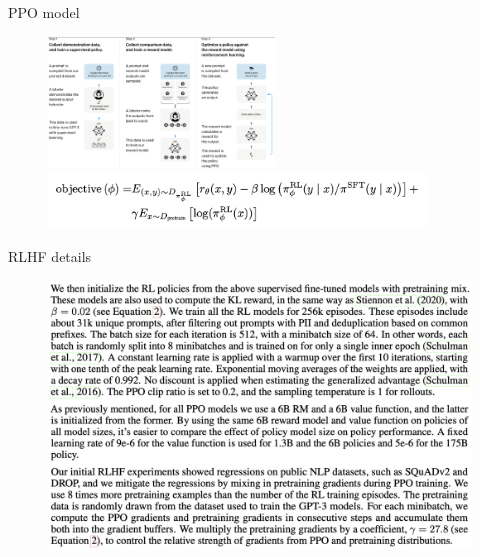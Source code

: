 \begin{vbframe}{PPO model}


\begin{figure}
\centering
\includegraphics[width = 6cm]{figure/threesteps.png}

\includegraphics[width = 10cm]{figure/objectiveppo.png}
\end{figure}



\vfill

\end{vbframe}


\begin{vbframe}{RLHF details}


\begin{figure}
\centering
\includegraphics[width = 12cm]{figure/rlhfdetails.png}
\end{figure}



\vfill

\end{vbframe}




